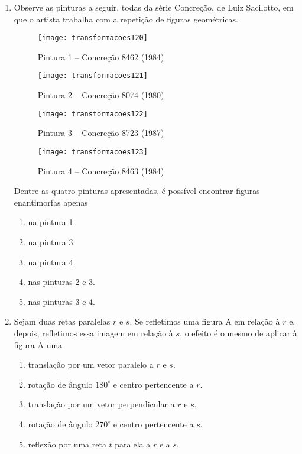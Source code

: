 \begin{enumerate}
\item Observe as pinturas a seguir, todas da série Concreção, de Luiz Sacilotto, em que o artista trabalha com a repetição de figuras geométricas. 


\begin{multicols}{2}
\begin{figure}[H]
\centering

\texttt{[image: transformacoes120]}
\caption{Pintura 1 – Concreção 8462 (1984)}
\label{}
\end{figure}
\begin{figure}[H]
\centering

\texttt{[image: transformacoes121]}
\caption{Pintura 2 – Concreção 8074 (1980)}
\label{}
\end{figure}
\begin{figure}[H]
\centering

\texttt{[image: transformacoes122]}
\caption{Pintura 3 – Concreção 8723 (1987)}
\label{}
\end{figure}
\begin{figure}[H]
\centering

\texttt{[image: transformacoes123]}
\caption{Pintura 4 – Concreção 8463 (1984)}
\label{}
\end{figure}
\end{multicols}

Dentre as quatro pinturas apresentadas, é possível encontrar figuras enantimorfas apenas 
\begin{enumerate}
\item na pintura 1.
\item na pintura 3.
\item na pintura 4. 
\item nas pinturas 2 e 3.
\item nas pinturas 3 e 4.
\end{enumerate}


\item Sejam duas retas paralelas $r$ e $s$. Se refletimos uma figura A em relação à $r$ e, depois, refletimos essa imagem em relação à $s$, o efeito é o mesmo de aplicar à figura A uma
\begin{enumerate}
\item translação por um vetor paralelo a $r$ e $s$. 
\item rotação de ângulo $180^{\circ}$ e centro pertencente a $r$.
\item translação por um vetor perpendicular a $r$ e $s$.
\item rotação de ângulo $270^{\circ}$ e centro pertencente a $s$.
\item reflexão por uma reta $t$ paralela a $r$ e a $s$.
\end{enumerate}


\end{enumerate}
